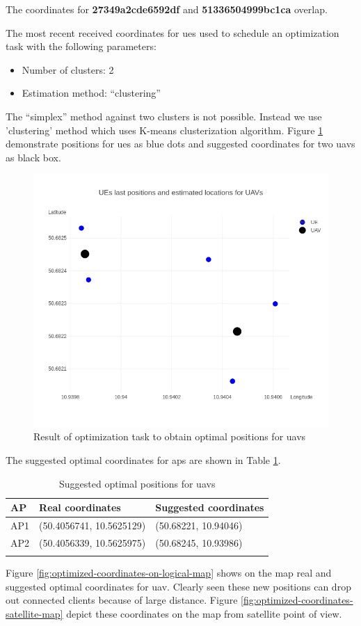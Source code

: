 The coordinates for \textbf{27349a2cde6592df} and
\textbf{51336504999bc1ca} overlap.

The most recent received coordinates for \glspl{ue} used to schedule an optimization task with the following parameters:

\begin{itemize}
\tightlist
\item
  Number of clusters: 2
\item
  Estimation method: ``clustering''
\end{itemize}

The ``simplex'' method against two clusters is not possible. Instead we use 'clustering' method which uses K-means clusterization algorithm. Figure \ref{fig:ues-positions-and-suggested-optimal-positions-for-uavs} demonstrate positions for \glspl{ue} as blue dots and suggested coordinates for two \glspl{uav} as black box.

\begin{figure}[H]
	\centering
	\includegraphics[width=0.5\linewidth,keepaspectratio]{images/Expt4_Estimated UAVs_locations.png}
\caption{Result of optimization task to obtain optimal positions for \glspl{uav}}
\label{fig:ues-positions-and-suggested-optimal-positions-for-uavs}
\end{figure}

The suggested optimal coordinates for \glspl{ap} are shown in Table \ref{tab:optimal-coordinates}.

\begin{longtable}[]{@{}lll@{}}
\caption{Suggested optimal positions for \glspl{uav} }\tabularnewline
\toprule
AP & Real coordinates & Suggested coordinates\tabularnewline
\midrule
\endhead
AP1 & (50.4056741, 10.5625129) & (50.68221, 10.94046)\tabularnewline
AP2 & (50.4056339, 10.5625975) & (50.68245, 10.93986)\tabularnewline
\bottomrule
\label{tab:optimal-coordinates}
\end{longtable}

Figure \ref{fig:optimized-coordinates-on-logical-map} shows on the map real and suggested optimal coordinates for \gls{uav}. Clearly seen these new positions can drop out connected clients because of large distance. Figure \ref{fig:optimized-coordinates-satellite-map} depict these coordinates on the map from satellite point of view.

